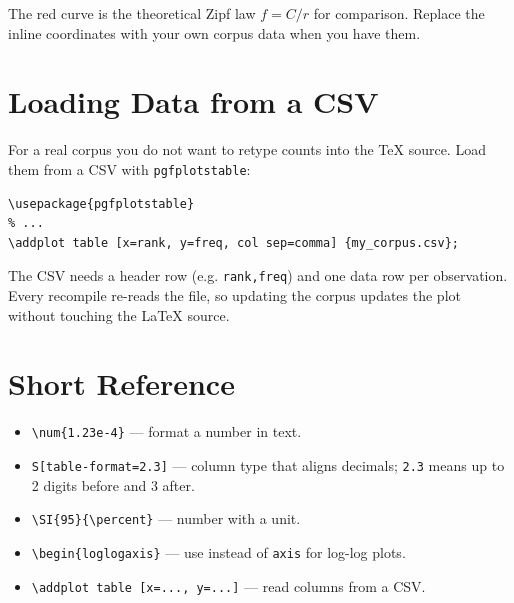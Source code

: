 \documentclass[11pt,a4paper]{article}
\begin{document}
The red curve is the theoretical Zipf law $f = C/r$ for comparison. Replace
the inline coordinates with your own corpus data when you have them.

\section{Loading Data from a CSV}

For a real corpus you do not want to retype counts into the \TeX{} source.
Load them from a CSV with \texttt{pgfplotstable}:

\begin{verbatim}
\usepackage{pgfplotstable}
% ...
\addplot table [x=rank, y=freq, col sep=comma] {my_corpus.csv};
\end{verbatim}

The CSV needs a header row (e.g. \texttt{rank,freq}) and one data row per
observation. Every recompile re-reads the file, so updating the corpus
updates the plot without touching the LaTeX source.

\section{Short Reference}

\begin{itemize}
    \item \verb|\num{1.23e-4}| --- format a number in text.
    \item \verb|S[table-format=2.3]| --- column type that aligns decimals;
          \texttt{2.3} means up to 2 digits before and 3 after.
    \item \verb|\SI{95}{\percent}| --- number with a unit.
    \item \verb|\begin{loglogaxis}| --- use instead of \texttt{axis} for log-log plots.
    \item \verb|\addplot table [x=..., y=...]| --- read columns from a CSV.
\end{itemize}
\end{document}
